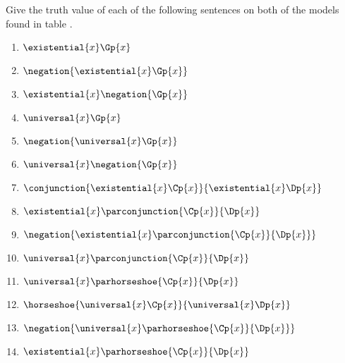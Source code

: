  Give the truth value of each of the following sentences on both of the models found in table . 
\begin{multicols}{2}
\begin{enumerate}
\item $\existential{\variable{x}}\Gp{\variable{x}}$
\item $\negation{\existential{\variable{x}}\Gp{\variable{x}}}$
\item $\existential{\variable{x}}\negation{\Gp{\variable{x}}}$
\item $\universal{\variable{x}}\Gp{\variable{x}}$
\item $\negation{\universal{\variable{x}}\Gp{\variable{x}}}$
\item $\universal{\variable{x}}\negation{\Gp{\variable{x}}}$
\item $\conjunction{\existential{\variable{x}}\Cp{\variable{x}}}{\existential{\variable{x}}\Dp{\variable{x}}}$
\item $\existential{\variable{x}}\parconjunction{\Cp{\variable{x}}}{\Dp{\variable{x}}}$
\item $\negation{\existential{\variable{x}}\parconjunction{\Cp{\variable{x}}}{\Dp{\variable{x}}}}$
\item $\universal{\variable{x}}\parconjunction{\Cp{\variable{x}}}{\Dp{\variable{x}}}$
\item $\universal{\variable{x}}\parhorseshoe{\Cp{\variable{x}}}{\Dp{\variable{x}}}$
\item $\horseshoe{\universal{\variable{x}}\Cp{\variable{x}}}{\universal{\variable{x}}\Dp{\variable{x}}}$
\item $\negation{\universal{\variable{x}}\parhorseshoe{\Cp{\variable{x}}}{\Dp{\variable{x}}}}$
\item $\existential{\variable{x}}\parhorseshoe{\Cp{\variable{x}}}{\Dp{\variable{x}}}$
\end{enumerate}
\end{multicols}

